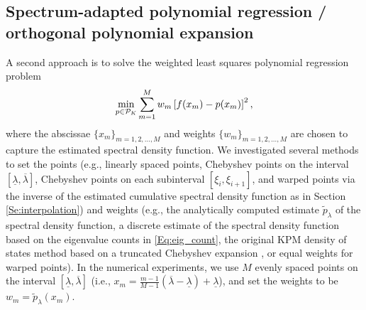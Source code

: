 \documentclass{article}
\begin{document}
\subsection{Spectrum-adapted polynomial regression / orthogonal polynomial expansion} 
A second approach is to solve the weighted least squares polynomial regression problem
\vspace{-.15in}
\begin{align*}
\min_{p \in {\cal P}_K} \sum_{m=1}^M w_m \left[f(x_m)-p(x_m)\right]^2,
\end{align*}
where the abscissae $\{x_m\}_{m=1,2,\ldots,M}$ and weights $\{w_m\}_{m=1,2,\ldots,M}$ are chosen to capture the estimated spectral density function. 
We investigated several methods to set the points (e.g., linearly spaced points, Chebyshev points on the interval $[\underline{\lambda},\overline{\lambda}]$, Chebyshev points on each subinterval $[\xi_i,\xi_{i+1}]$, and warped points via the inverse of the estimated cumulative spectral density function as in Section \ref{Se:interpolation}) and weights (e.g., the analytically computed estimate $\tilde{p}_{\lambda}$ of the spectral density function, a discrete estimate of the spectral density function
 based on the eigenvalue counts in \eqref{Eq:eig_count}, the original KPM density of states method based on a truncated Chebyshev expansion \cite[Eq. 3.11]{lin_spectral_density}, or equal weights %
for warped points). In the numerical experiments, we use $M$ evenly spaced points on the interval $[\underline{\lambda},\overline{\lambda}]$ (i.e., $x_m=\frac{m-1}{M-1}(\overline{\lambda}-\underline{\lambda})+\underline{\lambda}$), and set the weights to be $w_m=\tilde{p}_{\lambda}(x_m)$.
 
\end{document}
